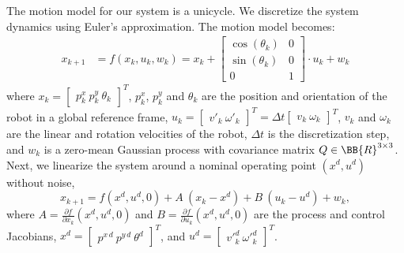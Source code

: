 The motion model for our system is a unicycle.
We discretize the system dynamics
using Euler's approximation. The motion
model becomes:
{\small
\begin{align}
\label{eq:unicycle-mm-disc}
x_{k+1} &= f(x_k, u_k, w_k) = x_k +
\begin{bmatrix} \cos(\theta_k) & 0 \\ \sin(\theta_k) & 0 \\ 0 & 1 \end{bmatrix} \cdot
u_k + w_k
\end{align}
}%
where
$x_k = \begin{bmatrix} p^x_k\  p^y_k\ \theta_k \end{bmatrix}^T$,
$p^x_k$, $p^y_k$ and $\theta_k$ are the position and orientation of the robot
in a global reference frame,
$u_k = \begin{bmatrix} v'_k\ \omega'_k \end{bmatrix}^T = \Delta t \begin{bmatrix} v_k \ \omega_k \end{bmatrix}^T$,
$v_k$ and $\omega_k$ are the linear and rotation velocities
of the robot,
$\Delta t$ is the discretization step, and
$w_k$ is a zero-mean Gaussian process with covariance matrix
$Q \in \BB{R}^{3\times 3}$.
%
Next, we linearize the system around a nominal
operating point $(x^d, u^d)$ without noise,
\begin{equation}
\label{eq:unycycle-lti}
x_{k+1}  =  f(x^d, u^d, 0) + A \ (x_k - x^d) + B \ (u_k - u^d) + w_k,
\end{equation}
where $A = \frac{\partial f}{\partial x_k} (x^d, u^d, 0)$
and $B = \frac{\partial f}{\partial u_k} (x^d, u^d, 0)$
are the process and control Jacobians,
$x^d = \begin{bmatrix} p^{x\,d} \  p^{y\,d}\ \theta^d \end{bmatrix}^T$,
and $u^d = \begin{bmatrix} v'^d_k\ \omega'^d_k \end{bmatrix}^T$.

